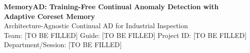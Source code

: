 \documentclass[12pt]{article}
\begin{document}
\fontsize{30}{36}\selectfont

\begin{tcolorbox}[
  enhanced,
  colback=headerbg,
  colframe=headerbg,
  boxrule=0pt,
  arc=10pt,
  left=22pt,right=22pt,top=18pt,bottom=18pt,
  height=5.6in,
  valign=center
]
{\color{white}\fontsize{62}{68}\selectfont\textbf{MemoryAD: Training-Free Continual Anomaly Detection with Adaptive Coreset Memory}}\\[6pt]
{\color{white}\fontsize{36}{42}\selectfont Architecture-Agnostic Continual AD for Industrial Inspection}\\[10pt]
{\color{white}\fontsize{28}{34}\selectfont Team: [TO BE FILLED] \hfill Guide: [TO BE FILLED] \hfill Project ID: [TO BE FILLED] \hfill Department/Session: [TO BE FILLED]}
\end{tcolorbox}

\vspace{0.35cm}
\end{document}
